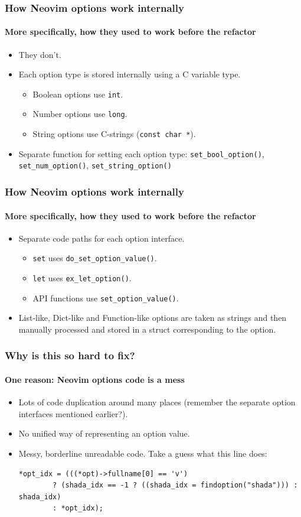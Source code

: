 \documentclass[10pt]{beamer}
\begin{document}
\begin{frame}[fragile]
\frametitle{How Neovim options work internally}
\framesubtitle{More specifically, how they used to work before the refactor}
\pause
\begin{itemize}
    \item They don't.\pause
    \item Each option type is stored internally using a C variable type.
    \begin{itemize}
        \item Boolean options use \lstinline{int}.
        \item Number options use \lstinline{long}.
        \item String options use C-strings (\lstinline{const char *}).
    \end{itemize}
    \item Separate function for setting each option type: \lstinline{set_bool_option()},
    \lstinline{set_num_option()}, \lstinline{set_string_option()}
\end{itemize}
\end{frame}
\begin{frame}[fragile]
\frametitle{How Neovim options work internally}
\framesubtitle{More specifically, how they used to work before the refactor}
\begin{itemize}
    \item Separate code paths for each option interface.
    \begin{itemize}
        \item \lstinline[style=vim_style]{set} uses \lstinline{do_set_option_value()}.
        \item \lstinline[style=vim_style]{let} uses \lstinline{ex_let_option()}.
        \item API functions use \lstinline{set_option_value()}.
    \end{itemize}
    \item List-like, Dict-like and Function-like options are taken as strings and then manually
        processed and stored in a struct corresponding to the option.
\end{itemize}
\end{frame}
\begin{frame}[fragile]
\frametitle{Why is this so hard to fix?}
\framesubtitle{One reason: Neovim options code is a mess}
\begin{itemize}
    \item Lots of code duplication around many places (remember the separate option interfaces
        mentioned earlier?).
    \item No unified way of representing an option value.
    \item Messy, borderline unreadable code. Take a guess what this line does:
\begin{lstlisting}
*opt_idx = (((*opt)->fullname[0] == 'v')
        ? (shada_idx == -1 ? ((shada_idx = findoption("shada"))) : shada_idx)
        : *opt_idx);
\end{lstlisting}
\end{itemize}
\end{frame}
\end{document}
